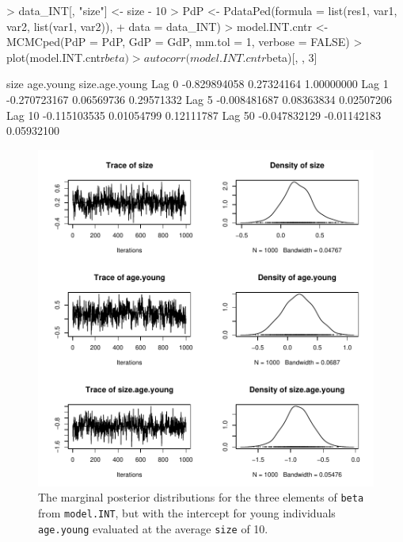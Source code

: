 \documentclass{article}
\begin{document}
\begin{Schunk}
\begin{Sinput}
> data_INT[, "size"] <- size - 10
> PdP <- PdataPed(formula = list(res1, var1, var2, list(var1, var2)), 
+     data = data_INT)
> model.INT.cntr <- MCMCped(PdP = PdP, GdP = GdP, mm.tol = 1, verbose = FALSE)
> plot(model.INT.cntr$beta)
> autocorr(model.INT.cntr$beta)[, , 3]
\end{Sinput}
\begin{Soutput}
               size   age.young size.age.young
Lag 0  -0.829894058  0.27324164     1.00000000
Lag 1  -0.270723167  0.06569736     0.29571332
Lag 5  -0.008481687  0.08363834     0.02507206
Lag 10 -0.115103535  0.01054799     0.12111787
Lag 50 -0.047832129 -0.01142183     0.05932100
\end{Soutput}
\end{Schunk}


\begin{figure}[!h]
\begin{center}
\includegraphics{Tutorial-062}
\end{center}
\caption{The marginal posterior distributions for the three elements of \texttt{beta} from \texttt{model.INT}, but with the intercept for young individuals \texttt{age.young} evaluated at the average \texttt{size} of 10.  }
\label{INT.cntr-fig}
\end{figure}
\end{document}

